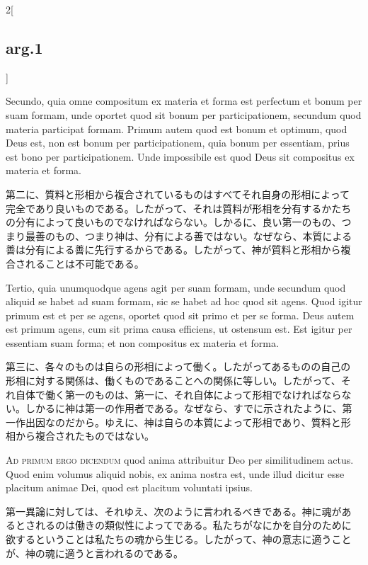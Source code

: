 \documentclass[paper=a4paper,fontsize=10pt,jafontsize=9pt,titlepage]{jlreq}
\begin{document}
\begin{paracol}{2}[\subsection{arg.1}]
\switchcolumn*

Secundo, quia omne compositum ex materia et forma est perfectum et
bonum per suam formam, unde oportet quod sit bonum per
participationem, secundum quod materia participat formam.  Primum
autem quod est bonum et optimum, quod Deus est, non est bonum per
participationem, quia bonum per essentiam, prius est bono per
participationem.  Unde impossibile est quod Deus sit compositus ex
materia et forma.

\switchcolumn

第二に、質料と形相から複合されているものはすべてそれ自身の形相によって
完全であり良いものである。したがって、それは質料が形相を分有するかたち
の分有によって良いものでなければならない。しかるに、良い第一のもの、つ
まり最善のもの、つまり神は、分有による善ではない。なぜなら、本質による
善は分有による善に先行するからである。したがって、神が質料と形相から複
合されることは不可能である。

\switchcolumn*

Tertio, quia unumquodque agens agit per suam formam, unde secundum
quod aliquid se habet ad suam formam, sic se habet ad hoc quod sit
agens.  Quod igitur primum est et per se agens, oportet quod sit primo
et per se forma.  Deus autem est primum agens, cum sit prima causa
efficiens, ut ostensum est.  Est igitur per essentiam suam forma; et
non compositus ex materia et forma.

\switchcolumn

第三に、各々のものは自らの形相によって働く。したがってあるものの自己の
形相に対する関係は、働くものであることへの関係に等しい。したがって、そ
れ自体で働く第一のものは、第一に、それ自体によって形相でなければならな
い。しかるに神は第一の作用者である。なぜなら、すでに示されたように、第
一作出因なのだから。ゆえに、神は自らの本質によって形相であり、質料と形
相から複合されたものではない。

\switchcolumn*[\subsection{ad.1}]

\textsc{Ad primum ergo dicendum} quod anima attribuitur Deo per
similitudinem actus. Quod enim volumus aliquid nobis, ex anima nostra
est, unde illud dicitur esse placitum animae Dei, quod est placitum
voluntati ipsius.

\switchcolumn

第一異論に対しては、それゆえ、次のように言われるべきである。神に魂があ
るとされるのは働きの類似性によってである。私たちがなにかを自分のために
欲するということは私たちの魂から生じる。したがって、神の意志に適うこと
が、神の魂に適うと言われるのである。


\end{paracol}
\end{document}
